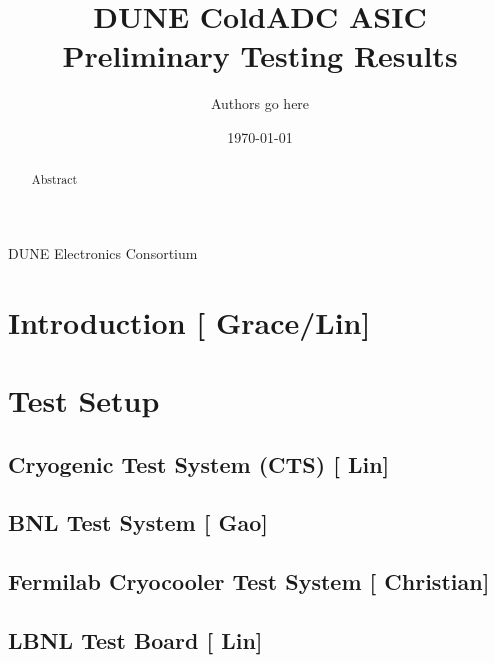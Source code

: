 \documentclass[10pt]{article}
\begin{document}

\title{DUNE ColdADC ASIC Preliminary Testing Results}

\date{\today}
\author{Authors go here}
%	
%	

\maketitle

\centerline{DUNE Electronics Consortium}



\begin{abstract}
Abstract
\end{abstract}


\newpage
\tableofcontents

\newpage

\section{Introduction [{\color{red} Grace/Lin}] }




\section{Test Setup}

\subsection{Cryogenic Test System (CTS) [{\color{red} Lin}] }

\subsection{BNL Test System [{\color{red} Gao}] }

\subsection{Fermilab Cryocooler Test System [{\color{red} Christian}] }

\subsection{LBNL Test Board  [{\color{red} Lin}] }

\end{document}

